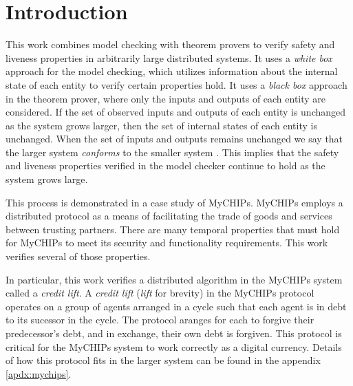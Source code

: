 \documentclass[runningheads]{llncs}
\begin{document}


\maketitle

\section{Introduction}
\label{chap:introduction}
This work combines model checking with theorem provers to verify safety and liveness properties in arbitrarily large distributed systems.
It uses a \emph{white box} approach for the model checking, which utilizes information about the internal state of each entity to verify certain properties hold.
It uses a \emph{black box} approach in the theorem prover, where only the inputs and outputs of each entity are considered.
If the set of observed inputs and outputs of each entity is unchanged as the system grows larger, then the set of internal states of each entity is unchanged.
When the set of inputs and outputs remains unchanged we say that the larger system \emph{conforms} to the smaller system \cite{dill_trace_theory}. This implies that the safety and liveness properties verified in the model checker continue to hold as the system grows large.

This process is demonstrated in a case study of MyCHIPs. MyCHIPs employs a distributed protocol as a means of facilitating the trade of goods and services between trusting partners. There are many temporal properties that must hold for MyCHIPs to meet its security and functionality requirements. This work verifies several of those properties.

In particular, this work verifies a distributed algorithm in the MyCHIPs system called a \emph{credit lift}. A \emph{credit lift} (\emph{lift} for brevity) in the MyCHIPs protocol operates on a group of agents arranged in a cycle such that each agent is in debt to its sucessor in the cycle. The protocol aranges for each to forgive their predecessor's debt, and in exchange, their own debt is forgiven. This protocol is critical for the MyCHIPs system to work correctly as a digital currency. Details of how this protocol fits in the larger system can be found in the appendix \ref{apdx:mychips}.
\end{document}
